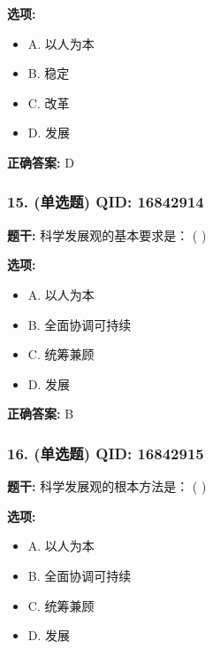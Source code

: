 \documentclass[12pt,UTF8]{ctexart}
\begin{document}
\textbf{选项:}
\begin{itemize}[leftmargin=*]

  \item A. 以人为本

  \item B. 稳定

  \item C. 改革

  \item D. 发展

\end{itemize}

\textbf{正确答案:}
D

\vspace{0.3em}\hrulefill\vspace{0.7em}

\subsubsection*{15. (单选题) \small QID: 16842914}

\textbf{题干:}
科学发展观的基本要求是： ( )

\textbf{选项:}
\begin{itemize}[leftmargin=*]

  \item A. 以人为本

  \item B. 全面协调可持续

  \item C. 统筹兼顾

  \item D. 发展

\end{itemize}

\textbf{正确答案:}
B

\vspace{0.3em}\hrulefill\vspace{0.7em}

\subsubsection*{16. (单选题) \small QID: 16842915}

\textbf{题干:}
科学发展观的根本方法是： ( )

\textbf{选项:}
\begin{itemize}[leftmargin=*]

  \item A. 以人为本

  \item B. 全面协调可持续

  \item C. 统筹兼顾

  \item D. 发展

\end{itemize}
\end{document}
